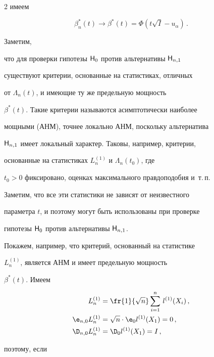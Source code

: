 \begin{multicols}{2}
имеем


\begin{equation}


\beta_n^*(t)\to \beta^*(t)= \Phi\left (


t\sqrt{I}-u_{\alpha}\right )\,.


\label{6.26b}


\end{equation}


Заметим,


что для проверки гипотезы ${\sf H}_0$ против альтернативы ${\sf H}_{n,1}$


существуют критерии, основанные на статистиках, отличных


от $\Lambda_n(t)$, и имеющие ту же предельную мощность


$\beta^*(t)$. Такие критерии называются асимптотически наиболее


мощными (АНМ), точнее локально АНМ, поскольку альтернатива


${\sf H}_{n,1}$ имеет локальный характер. Таковы, например, критерии,


основанные на статистиках $L_n^{(1)}$ и $\Lambda_n(t_0)$, где


$t_0 > 0$ фиксировано, оценках максимального правдоподобия и~т.\,п.


Заметим, что все эти статистики не зависят от неизвестного


параметра $t$, и поэтому могут быть использованы при проверке


гипотезы ${\sf H}_0$ против альтернативы ${\sf H}_{n,1}$.





Покажем, например, что критерий, основанный на статистике


$L_n^{(1)}$, является АНМ и имеет предельную мощность


$\beta^*(t)$. Имеем


\begin{align*}


L_n^{(1)} &= \fr{1}{\sqrt{n}}\sum_{i=1}^{n}\,l^{(1)}(X_i)\,, \\


{\e}_{n,0}L_n^{(1)}& = \sqrt{n}\cdot {\e}_0l^{(1)}(X_1) = 0\,, \\


{\D}_{n,0}L_n^{(1)}& = {\D}_0l^{(1)}(X_1) = I\,,


\end{align*}


поэтому, если



\end{multicols}
